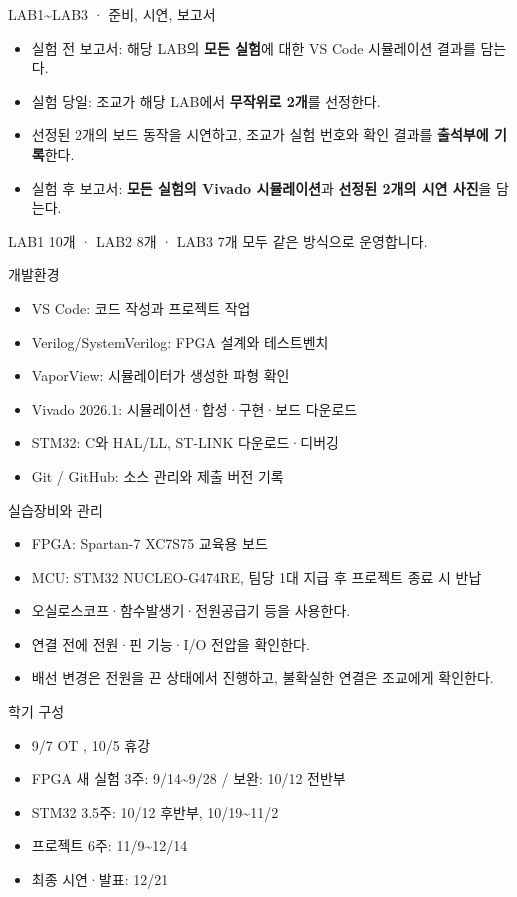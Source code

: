 \documentclass[aspectratio=169,11pt,t]{beamer}
\begin{document}
\begin{frame}{LAB1\textasciitilde{}LAB3 · 준비, 시연, 보고서}
\begin{itemize}
\item 실험 전 보고서: 해당 LAB의 \textbf{모든 실험}에 대한 VS Code 시뮬레이션 결과를 담는다.
\item 실험 당일: 조교가 해당 LAB에서 \textbf{무작위로 2개}를 선정한다.
\item 선정된 2개의 보드 동작을 시연하고, 조교가 실험 번호와 확인 결과를 \textbf{출석부에 기록}한다.
\item 실험 후 보고서: \textbf{모든 실험의 Vivado 시뮬레이션}과 \textbf{선정된 2개의 시연 사진}을 담는다.
\end{itemize}
\vspace{0.2cm}
LAB1 10개 · LAB2 8개 · LAB3 7개 모두 같은 방식으로 운영합니다.
\end{frame}

\begin{frame}{개발환경}
\begin{itemize}
\item VS Code: 코드 작성과 프로젝트 작업
\item Verilog/SystemVerilog: FPGA 설계와 테스트벤치
\item VaporView: 시뮬레이터가 생성한 파형 확인
\item Vivado 2026.1: 시뮬레이션·합성·구현·보드 다운로드
\item STM32: C와 HAL/LL, ST-LINK 다운로드·디버깅
\item Git / GitHub: 소스 관리와 제출 버전 기록
\end{itemize}
\end{frame}

\begin{frame}{실습장비와 관리}
\begin{itemize}
\item FPGA: Spartan-7 XC7S75 교육용 보드
\item MCU: STM32 NUCLEO-G474RE, 팀당 1대 지급 후 프로젝트 종료 시 반납
\item 오실로스코프·함수발생기·전원공급기 등을 사용한다.
\item 연결 전에 전원·핀 기능·I/O 전압을 확인한다.
\item 배선 변경은 전원을 끈 상태에서 진행하고, 불확실한 연결은 조교에게 확인한다.
\end{itemize}
\end{frame}

\begin{frame}{학기 구성}
\begin{itemize}
\item 9/7 OT , 10/5 휴강
\item FPGA 새 실험 3주: 9/14\textasciitilde{}9/28 / 보완: 10/12 전반부
\item STM32 3.5주: 10/12 후반부, 10/19\textasciitilde{}11/2
\item 프로젝트 6주: 11/9\textasciitilde{}12/14
\item 최종 시연·발표: 12/21
\end{itemize}
\end{frame}
\end{document}
